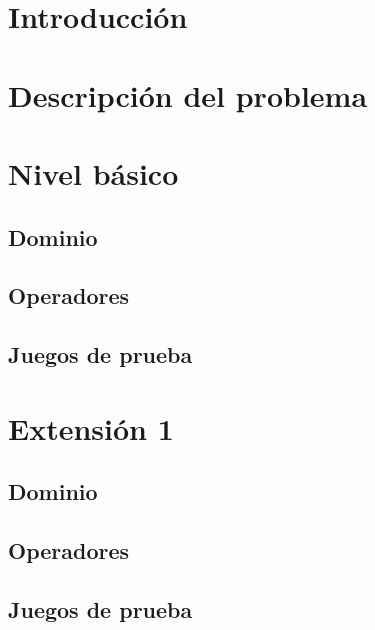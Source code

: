 \documentclass[12pt]{article}
\author{Carlos Bergillos, Adrià Cabeza, Roger Vilaseca}
\begin{document}
\maketitle

\newpage

\tableofcontents

\newpage


\section{Introducción}

\section{Descripción del problema}


\section{Nivel básico}

\subsection{Dominio}

\subsection{Operadores}

\subsection{Juegos de prueba}


\section{Extensión 1}

\subsection{Dominio}

\subsection{Operadores}

\subsection{Juegos de prueba}
\end{document}
